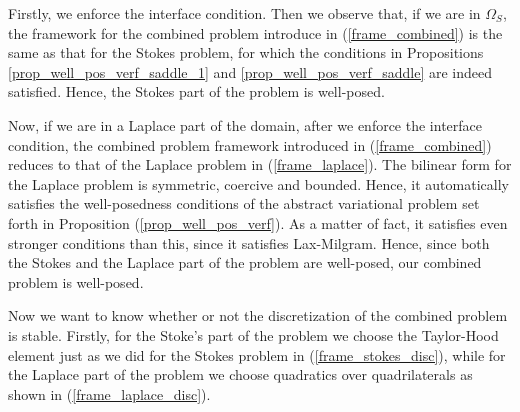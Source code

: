 \documentclass[12pt,a4paper]{article}
\theoremstyle{definition}
\begin{document}
 Firstly, we enforce the interface condition.  Then we observe that, if we are in $\Omega_S$, the framework for the combined problem introduce in (\ref{frame_combined}) is the same as that for the Stokes problem, for which the conditions in Propositions \ref{prop_well_pos_verf_saddle_1} and \ref{prop_well_pos_verf_saddle} are indeed satisfied.  Hence, the Stokes part of the problem is well-posed.
 
 Now, if we are in a Laplace part of the domain, after we enforce the interface condition, the combined problem framework introduced in (\ref{frame_combined}) reduces to that of the Laplace problem in (\ref{frame_laplace}).  The bilinear form for the Laplace problem is symmetric, coercive and bounded.  Hence, it automatically satisfies the well-posedness conditions of the abstract variational problem set forth in Proposition (\ref{prop_well_pos_verf}).  As a matter of fact, it satisfies even stronger conditions than this, since it satisfies Lax-Milgram. 
  Hence, since both the Stokes and the Laplace part of the problem are  well-posed, our combined problem is well-posed. 
 
  Now we want to know whether or not the discretization of the combined problem is stable.  Firstly, for the Stoke's part of the problem we choose the Taylor-Hood element just as we did for the Stokes problem in (\ref{frame_stokes_disc}), while for the Laplace part of the problem we choose quadratics over quadrilaterals as shown in (\ref{frame_laplace_disc}).
  
\end{document}
